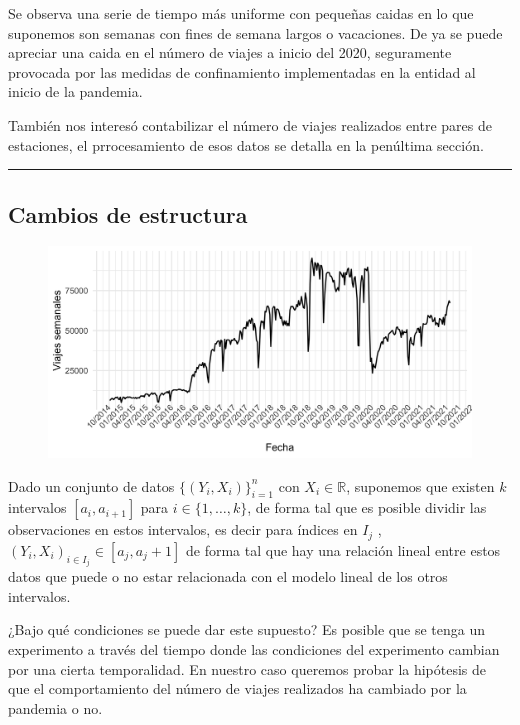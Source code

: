 \documentclass[
]{article}
\begin{document}
Se observa una serie de tiempo más uniforme con pequeñas caidas en lo
que suponemos son semanas con fines de semana largos o vacaciones. De ya
se puede apreciar una caida en el número de viajes a inicio del 2020,
seguramente provocada por las medidas de confinamiento implementadas en
la entidad al inicio de la pandemia.

También nos interesó contabilizar el número de viajes realizados entre
pares de estaciones, el prrocesamiento de esos datos se detalla en la
penúltima sección.

\begin{center}\rule{0.5\linewidth}{0.5pt}\end{center}
\newpage
\hypertarget{cambios-de-estructura}{%
\subsection{Cambios de estructura}\label{cambios-de-estructura}}

\begin{figure}[!h]
\centering
\includegraphics[width=12cm]{../plots/serie1.png}
\end{figure}

Dado un conjunto de datos \(\{(Y_i, X_i)\}_{i=1}^n\) con \(X_i \in \mathbb{R}\),
suponemos que existen \(k\) intervalos \([a_i, a_{i+1}]\) para
\(i \in \{1, \dots, k\}\), de forma tal que es posible dividir las
observaciones en estos intervalos, es decir para índices en \(I_j\) ,
\((Y_i, X_i)_{i \in I_j} \in [a_j, a_j+1]\) de forma tal que hay una
relación lineal entre estos datos que puede o no estar relacionada con
el modelo lineal de los otros intervalos.

¿Bajo qué condiciones se puede dar este supuesto? Es posible que se
tenga un experimento a través del tiempo donde las condiciones del
experimento cambian por una cierta temporalidad. En nuestro caso
queremos probar la hipótesis de que el comportamiento del número de
viajes realizados ha cambiado por la pandemia o no.
\end{document}
